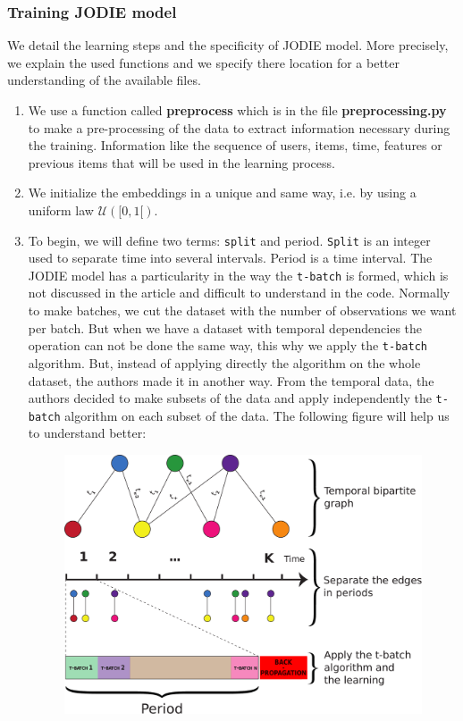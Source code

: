 \subsubsection{Training JODIE model} 


We detail the learning steps and the specificity of JODIE model. More precisely, we explain the used functions and we specify there location for a better understanding of the available files.

\begin{enumerate}
    \item We use a function called \textbf{preprocess} which is in the file \textbf{preprocessing.py} to make a pre-processing of the data to extract information necessary during the training. Information like the sequence of users, items, time, features or previous items that will be used in the learning process.
    \item We initialize the embeddings in a unique and same way, i.e. by using a uniform law $\mathcal{U}([0,1[)$.
    \item To begin, we will define two terms: \texttt{split} and period. \texttt{Split} is an integer used to separate time into several intervals. Period is a time interval. The JODIE model has a particularity in the way the \texttt{t-batch} is formed, which is not discussed in the article and difficult to understand in the code. Normally to make batches, we cut the dataset with the number of observations we want per batch. But when we have a dataset with temporal dependencies the operation can not be done the same way, this why we apply the \texttt{t-batch} algorithm. But, instead of applying directly the algorithm on the whole dataset, the authors made it in another way. From the temporal data, the authors decided to make subsets of the data and apply independently the \texttt{t-batch} algorithm on each subset of the data. The following figure will help us to understand better:
    \begin{figure}[H]
        \centering
        \includegraphics[width=1\textwidth]{image/pipeline_t-batch.pdf}

\end{figure}
\end{enumerate}

